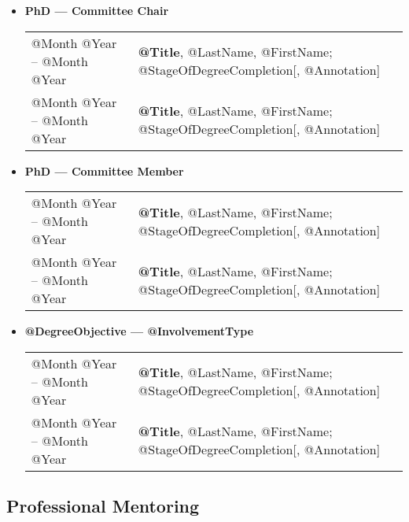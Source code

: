 \documentclass[10pt]{article}
\begin{document}
\begin{IOWA ONLY}
\begin{itemize}
\item[] \textbf{PhD --- Committee Chair} 
\\[1.3ex]
\begin{tabular}{l@{\quad\ }p{30em}} 
 @Month @Year -- @Month @Year
 & {\bf @Title}, @LastName, @FirstName; @StageOfDegreeCompletion[, @Annotation]
 \\[.5ex]
 @Month @Year -- @Month @Year
 & {\bf @Title}, @LastName, @FirstName; @StageOfDegreeCompletion[, @Annotation]
 \\[.5ex]
\end{tabular}

\item[] \textbf{PhD --- Committee Member}
\\[1.3ex]
\begin{tabular}{l@{\quad\ }p{30em}} 
 @Month @Year -- @Month @Year
 & {\bf @Title}, @LastName, @FirstName; @StageOfDegreeCompletion[, @Annotation]
 \\[.5ex]
 @Month @Year -- @Month @Year
 & {\bf @Title}, @LastName, @FirstName; @StageOfDegreeCompletion[, @Annotation]
 \\[.5ex]
\end{tabular}

\item[] \textbf{@DegreeObjective --- @InvolvementType}
\\[1.3ex]
\begin{tabular}{l@{\quad\ }p{30em}} 
 @Month @Year -- @Month @Year
 & {\bf @Title}, @LastName, @FirstName; @StageOfDegreeCompletion[, @Annotation]
 \\[.5ex]
 @Month @Year -- @Month @Year
 & {\bf @Title}, @LastName, @FirstName; @StageOfDegreeCompletion[, @Annotation]
 \\[.5ex]
\end{tabular}
\end{itemize}

\subsection*{Professional Mentoring}
\smallskip


\end{IOWA ONLY}
\end{document}
